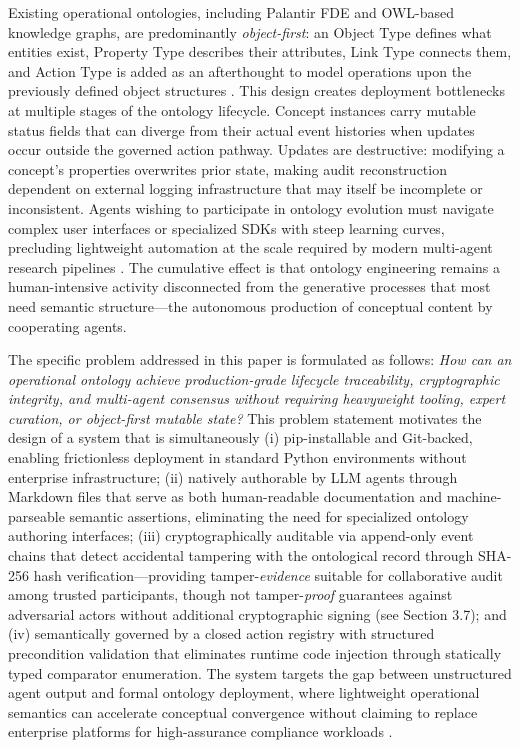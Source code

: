 Existing operational ontologies, including Palantir FDE and OWL-based knowledge graphs, are predominantly \emph{object-first}: an Object Type defines what entities exist, Property Type describes their attributes, Link Type connects them, and Action Type is added as an afterthought to model operations upon the previously defined object structures \cite{ref6}\cite{ref14}. This design creates deployment bottlenecks at multiple stages of the ontology lifecycle. Concept instances carry mutable status fields that can diverge from their actual event histories when updates occur outside the governed action pathway. Updates are destructive: modifying a concept's properties overwrites prior state, making audit reconstruction dependent on external logging infrastructure that may itself be incomplete or inconsistent. Agents wishing to participate in ontology evolution must navigate complex user interfaces or specialized SDKs with steep learning curves, precluding lightweight automation at the scale required by modern multi-agent research pipelines \cite{ref8}. The cumulative effect is that ontology engineering remains a human-intensive activity disconnected from the generative processes that most need semantic structure---the autonomous production of conceptual content by cooperating agents.

The specific problem addressed in this paper is formulated as follows: \emph{How can an operational ontology achieve production-grade lifecycle traceability, cryptographic integrity, and multi-agent consensus without requiring heavyweight tooling, expert curation, or object-first mutable state?} This problem statement motivates the design of a system that is simultaneously (i) pip-installable and Git-backed, enabling frictionless deployment in standard Python environments without enterprise infrastructure; (ii) natively authorable by LLM agents through Markdown files that serve as both human-readable documentation and machine-parseable semantic assertions, eliminating the need for specialized ontology authoring interfaces; (iii) cryptographically auditable via append-only event chains that detect accidental tampering with the ontological record through SHA-256 hash verification---providing tamper-\emph{evidence} suitable for collaborative audit among trusted participants, though not tamper-\emph{proof} guarantees against adversarial actors without additional cryptographic signing (see Section 3.7); and (iv) semantically governed by a closed action registry with structured precondition validation that eliminates runtime code injection through statically typed comparator enumeration. The system targets the gap between unstructured agent output and formal ontology deployment, where lightweight operational semantics can accelerate conceptual convergence without claiming to replace enterprise platforms for high-assurance compliance workloads \cite{ref13}.

